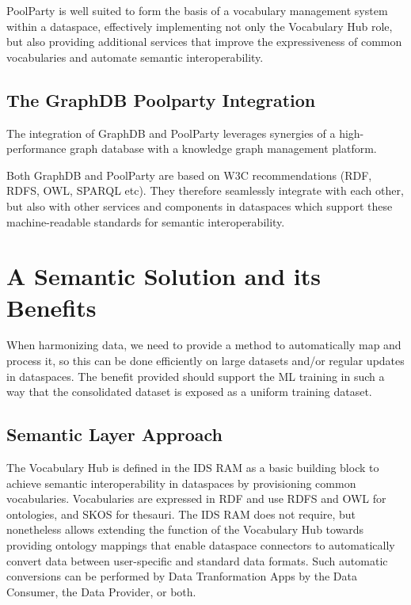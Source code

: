 \documentclass[
  super,
  preprint,
  3p]{elsarticle}
\begin{document}
PoolParty is well suited to form the basis of a vocabulary management
system within a dataspace, effectively implementing not only the
Vocabulary Hub role, but also providing additional services that improve
the expressiveness of common vocabularies and automate semantic
interoperability.

\subsection{The GraphDB Poolparty
Integration}\label{the-graphdb-poolparty-integration}

The integration of GraphDB and PoolParty leverages synergies of a
high-performance graph database with a knowledge graph management
platform.

Both GraphDB and PoolParty are based on W3C recommendations (RDF, RDFS,
OWL, SPARQL etc). They therefore seamlessly integrate with each other,
but also with other services and components in dataspaces which support
these machine-readable standards for semantic interoperability.

\section{A Semantic Solution and its
Benefits}\label{a-semantic-solution-and-its-benefits}

When harmonizing data, we need to provide a method to automatically map
and process it, so this can be done efficiently on large datasets and/or
regular updates in dataspaces. The benefit provided should support the
ML training in such a way that the consolidated dataset is exposed as a
uniform training dataset.

\subsection{Semantic Layer Approach}\label{semantic-layer-approach}

The Vocabulary Hub is defined in the IDS RAM as a basic building block
to achieve semantic interoperability in dataspaces by provisioning
common vocabularies. Vocabularies are expressed in RDF and use RDFS and
OWL for ontologies, and SKOS for thesauri. The IDS RAM does not require,
but nonetheless allows extending the function of the Vocabulary Hub
towards providing ontology mappings \citep{IDSARAMFunctional2023} that
enable dataspace connectors to automatically convert data between
user-specific and standard data formats. Such automatic conversions can
be performed by Data Tranformation Apps by the Data Consumer, the Data
Provider, or both.
\end{document}
